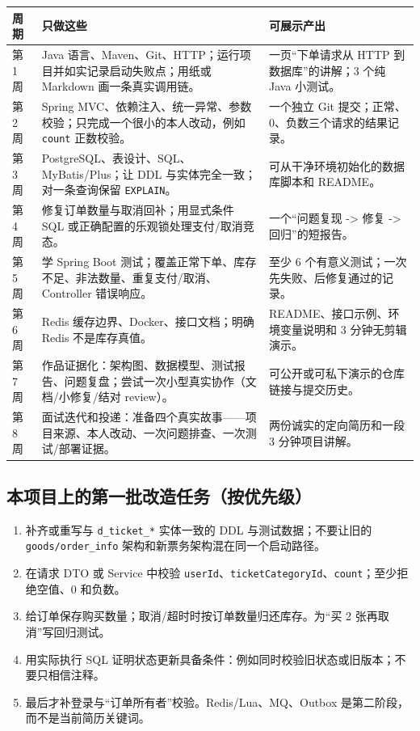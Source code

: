 \documentclass[a4paper,11pt]{article}
\begin{document}
\begin{longtable}{>{\raggedright\arraybackslash}p{} >{\raggedright\arraybackslash}p{} >{\raggedright\arraybackslash}p{}}
\textbf{周期} & \textbf{只做这些} & \textbf{可展示产出} \\
\hline
第 1 周 & Java 语言、Maven、Git、HTTP；运行项目并如实记录启动失败点；用纸或 Markdown 画一条真实调用链。 & 一页“下单请求从 HTTP 到数据库”的讲解；3 个纯 Java 小测试。 \\
第 2 周 & Spring MVC、依赖注入、统一异常、参数校验；只完成一个很小的本人改动，例如 \texttt{count} 正数校验。 & 一个独立 Git 提交；正常、0、负数三个请求的结果记录。 \\
第 3 周 & PostgreSQL、表设计、SQL、MyBatis/Plus；让 DDL 与实体完全一致；对一条查询保留 \texttt{EXPLAIN}。 & 可从干净环境初始化的数据库脚本和 README。 \\
第 4 周 & 修复订单数量与取消回补；用显式条件 SQL 或正确配置的乐观锁处理支付/取消竞态。 & 一个“问题复现 -> 修复 -> 回归”的短报告。 \\
第 5 周 & 学 Spring Boot 测试；覆盖正常下单、库存不足、非法数量、重复支付/取消、Controller 错误响应。 & 至少 6 个有意义测试；一次先失败、后修复通过的记录。 \\
第 6 周 & Redis 缓存边界、Docker、接口文档；明确 Redis 不是库存真值。 & README、接口示例、环境变量说明和 3 分钟无剪辑演示。 \\
第 7 周 & 作品证据化：架构图、数据模型、测试报告、问题复盘；尝试一次小型真实协作（文档/小修复/结对 review）。 & 可公开或可私下演示的仓库链接与提交历史。 \\
第 8 周 & 面试迭代和投递：准备四个真实故事——项目来源、本人改动、一次问题排查、一次测试/部署证据。 & 两份诚实的定向简历和一段 3 分钟项目讲解。 \\
\end{longtable}

\subsection{本项目上的第一批改造任务（按优先级）}

\begin{enumerate}
  \item 补齐或重写与 \texttt{d\_ticket\_*} 实体一致的 DDL 与测试数据；不要让旧的 \texttt{goods/order\_info} 架构和新票务架构混在同一个启动路径。
  \item 在请求 DTO 或 Service 中校验 \texttt{userId}、\texttt{ticketCategoryId}、\texttt{count}；至少拒绝空值、0 和负数。
  \item 给订单保存购买数量；取消/超时时按订单数量归还库存。为“买 2 张再取消”写回归测试。
  \item 用实际执行 SQL 证明状态更新具备条件：例如同时校验旧状态或旧版本；不要只相信注释。
  \item 最后才补登录与“订单所有者”校验。Redis/Lua、MQ、Outbox 是第二阶段，而不是当前简历关键词。
\end{enumerate}
\end{document}
